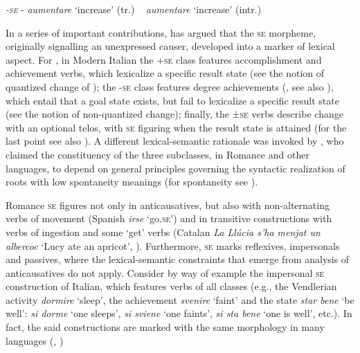 \documentclass[output=paper,colorlinks,citecolor=brown
]{langscibook}
\begin{document}
\ex \label{bentley_example_1c}	
\textit{\textsc{-\textsc{se}}} - \textit{aumentare} ‘increase’ (tr.) ~ \textit{aumentare} ‘increase’ (intr.)  \\
\z
\z

In a series of important contributions, \citet{cennamo1995patterns,cennamo1999late,cennamo2012aspectual,cennamo2015valency,cennamo2021anticausatives,cennamo2022anticausativization} has argued that the \textsc{se} morpheme, originally signalling an unexpressed causer, developed into a marker of lexical aspect. For \citet{cennamo2012aspectual}, in Modern Italian the +\textsc{se} class features accomplishment and achievement verbs, which lexicalize a specific result state (see the notion of quantized change of \cite{hay1999scalar,beavers2011affectedness}); the -\textsc{se} class features degree achievements 
(\cite[88—90]{dowty1979word}, see also \cite{bertinetto1995attempt,hay1999scalar,beavers2011affectedness}), which entail that a goal state exists, but fail to lexicalize a specific result state (see the notion of non-quantized change);  finally, the ±\textsc{se} verbs describe change with an optional telos, with \textsc{se} figuring when the result state is attained (for the last point see also \cites[{}][161—163]{folli2002constructing,jezek2003classi}). A different lexical-semantic rationale was invoked by \citet[96, 114—120]{alexiadou2015external}, who claimed the constituency of the three subclasses, in Romance and other languages, to depend on general principles governing the syntactic realization of roots with low spontaneity meanings (for spontaneity see \cite{haspelmath1993more,haspelmath2016universals}). 

Romance \textsc{se} figures not only in anticausatives, but also with non-alternating verbs of movement (Spanish \textit{irse} ‘go.\textsc{se}’) and in transitive constructions with verbs of ingestion and some ‘get’ verbs \citep[48]{levin1993english} (Catalan \textit{La Llúcia s’ha menjat un albercoc} ‘Lucy ate an apricot’, \cite[505]{acedomatellan2022argument}). Furthermore, \textsc{se} marks reflexives, impersonals and passives, where the lexical-semantic constraints that emerge from analysis of anticausatives do not apply. Consider by way of example the impersonal \textsc{se} construction of Italian, which features verbs of all classes (e.g., the Vendlerian activity \textit{dormire} ‘sleep’, the achievement \textit{svenire} ‘faint’ and the state \textit{star bene} ‘be well’: \textit{si dorme} ‘one sleeps’, \textit{si sviene} ‘one faints’, \textit{si sta bene} ‘one is well’, etc.). In fact, the said constructions are marked with the same morphology in many languages (\cite[371—374]{lyons1969introduction}, \cite{kemmer1993middle,beavers2023middle}) 
\end{document}
